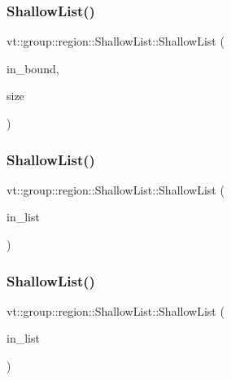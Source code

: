 \subsubsection{\texorpdfstring{Shallow\+List()}{ShallowList()}\hspace{0.1cm}{\footnotesize\ttfamily [1/5]}}
{\footnotesize\ttfamily vt\+::group\+::region\+::\+Shallow\+List\+::\+Shallow\+List (\begin{DoxyParamCaption}\item[{\hyperlink{structvt_1_1group_1_1region_1_1_region_abf426ff85bed72c1c6524fad6a9f1751}{Bound\+Type} const $\ast$}]{in\+\_\+bound,  }\item[{\hyperlink{structvt_1_1group_1_1region_1_1_region_a9bb381adf31111aae34dbc644bad6c1f}{Size\+Type} const \&}]{size }\end{DoxyParamCaption})}

\mbox{\label{structvt_1_1group_1_1region_1_1_shallow_list_a205b74129dffd8801bb6ad62614850bf}} 
\subsubsection{\texorpdfstring{Shallow\+List()}{ShallowList()}\hspace{0.1cm}{\footnotesize\ttfamily [2/5]}}
{\footnotesize\ttfamily vt\+::group\+::region\+::\+Shallow\+List\+::\+Shallow\+List (\begin{DoxyParamCaption}\item[{\hyperlink{structvt_1_1group_1_1region_1_1_list}{List} const \&}]{in\+\_\+list }\end{DoxyParamCaption})\hspace{0.3cm}{\ttfamily [explicit]}}

\mbox{\label{structvt_1_1group_1_1region_1_1_shallow_list_a119c08f1cd40f828b431716efe5d523f}} 
\subsubsection{\texorpdfstring{Shallow\+List()}{ShallowList()}\hspace{0.1cm}{\footnotesize\ttfamily [3/5]}}
{\footnotesize\ttfamily vt\+::group\+::region\+::\+Shallow\+List\+::\+Shallow\+List (\begin{DoxyParamCaption}\item[{\hyperlink{structvt_1_1group_1_1region_1_1_region_a4e35b2fc6dca06aca0b7bc0e19b35c5a}{List\+Type} const \&}]{in\+\_\+list }\end{DoxyParamCaption})\hspace{0.3cm}{\ttfamily [explicit]}}

